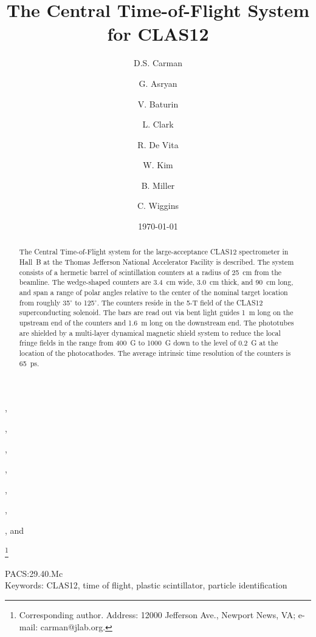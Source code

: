 \documentclass{elsart}
\begin{document}
\begin{frontmatter}

\title{The Central Time-of-Flight System for CLAS12}

\author[JLAB]{D.S. Carman},
\author[JLAB]{G. Asryan},
\author[JLAB]{V. Baturin},
\author[Glasgow]{L. Clark},
\author[INFN]{R. De Vita},
\author[KNU]{W. Kim}, 
\author[JLAB]{B. Miller}, and
\author[JLAB]{C. Wiggins} 

\address[JLAB]{Thomas Jefferson National Accelerator Facility, Newport News, VA 23606, USA}
\address[Glasgow]{University of Glasgow, Glasgow G12 8QQ, United Kingdom}
\address[INFN]{INFN, Sezione di Genova, 16146 Genova, Italy}
\address[KNU]{Kyungpook National University, Daegu 41566, Republic of Korea} 
\thanks[corresponding]{Corresponding author. Address: 12000 Jefferson Ave., Newport News, VA; 
e-mail: carman@jlab.org.}

\date{\today}


\begin{abstract}
The Central Time-of-Flight system for the large-acceptance CLAS12 spectrometer in Hall~B at 
the Thomas Jefferson National Accelerator Facility is described. The system consists of a 
hermetic barrel of scintillation counters at a radius of 25~cm from the beamline. The 
wedge-shaped counters are 3.4~cm wide, 3.0~cm thick, and 90~cm long, and span a range 
of polar angles relative to the center of the nominal target location from roughly 35$^\circ$ 
to 125$^\circ$. The counters reside in the 5-T field of the CLAS12 superconducting solenoid. The
bars are read out via bent light guides 1~m long on the upstream end of the counters and 1.6~m
long on the downstream end. The phototubes are shielded by a multi-layer dynamical magnetic shield
system to reduce the local fringe fields in the range from 400~G to 1000~G down to the level of
0.2~G at the location of the photocathodes. The average intrinsic time resolution of the counters is
65~ps.
\end{abstract}

\end{frontmatter}

PACS:29.40.Mc \\
Keywords: CLAS12, time of flight, plastic scintillator, particle identification
\newpage

\end{document}
